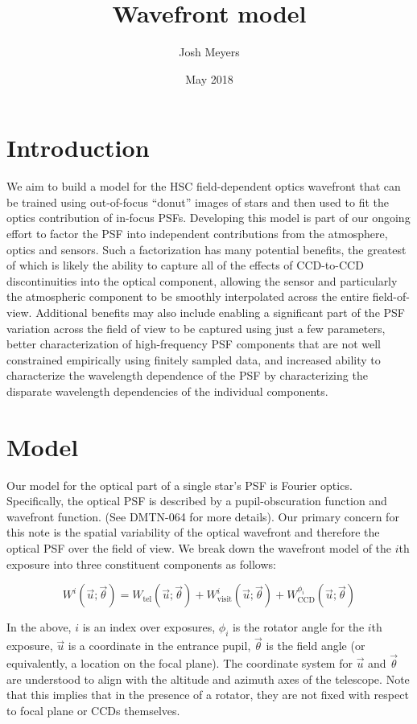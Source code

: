 \documentclass{article}
\title{Wavefront model}
\author{Josh Meyers}
\date{May 2018}
\begin{document}
\section{Introduction}

We aim to build a model for the HSC field-dependent optics wavefront that can be
trained using out-of-focus ``donut'' images of stars and then used to fit the
optics contribution of in-focus PSFs.  Developing this model is part of our
ongoing effort to factor the PSF into independent contributions from the
atmosphere, optics and sensors.  Such a factorization has many potential
benefits, the greatest of which is likely the ability to capture all of the
effects of CCD-to-CCD discontinuities into the optical component, allowing the
sensor and particularly the atmospheric component to be smoothly interpolated
across the entire field-of-view.  Additional benefits may also include enabling
a significant part of the PSF variation across the field of view to be captured
using just a few parameters, better characterization of high-frequency PSF
components that are not well constrained empirically using finitely sampled
data, and increased ability to characterize the wavelength dependence of the PSF
by characterizing the disparate wavelength dependencies of the individual
components.

\section{Model}

Our model for the optical part of a single star's PSF is Fourier optics.
Specifically, the optical PSF is described by a pupil-obscuration function and
wavefront function. (See DMTN-064 for more details).  Our primary concern for
this note is the spatial variability of the optical wavefront and therefore the
optical PSF over the field of view.  We break down the wavefront model of the
$i$th exposure into three constituent components as follows:

\begin{equation}
    W^i\left(\vec{u}; \vec{\theta}\right) =
    W_\mathrm{tel}\left(\vec{u}; \vec{\theta}\right) +
    W_\mathrm{visit}^i\left(\vec{u}; \vec{\theta}\right) +
    W_\mathrm{CCD}^{\phi_i}\left(\vec{u}; \vec{\theta}\right)
\end{equation}

In the above, $i$ is an index over exposures, $\phi_i$ is the rotator angle for
the $i$th exposure, $\vec{u}$ is a coordinate in the entrance pupil,
$\vec{\theta}$ is the field angle (or equivalently, a location on the focal
plane).  The coordinate system for $\vec{u}$ and $\vec{\theta}$ are understood
to align with the altitude and azimuth axes of the telescope. Note that this
implies that in the presence of a rotator, they are not fixed with respect to
focal plane or CCDs themselves.
\end{document}
